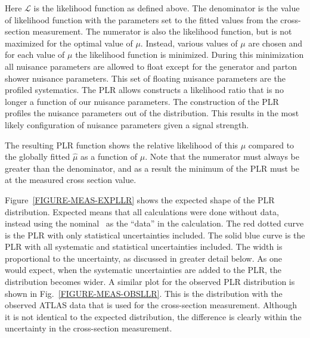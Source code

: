 \noindent
Here $\mathcal{L}$ is the likelihood function as defined above. The denominator is the value of likelihood function with the parameters set to the fitted values from the cross-section measurement. The numerator is also the likelihood function, but is not maximized for the optimal value of $\mu$. Instead, various values of $\mu$ are chosen and for each value of $\mu$ the likelihood function is minimized. During this minimization all nuisance parameters are allowed to float except for the generator and parton shower nuisance parameters. This set of floating nuisance parameters are the profiled systematics. The PLR allows constructs a likelihood ratio that is no longer a function of our nuisance parameters. The construction of the PLR profiles the nuisance parameters out of the distribution. This results in the most likely configuration of nuisance parameters given a signal strength. 


The resulting PLR function shows the relative likelihood of this $\mu$ compared to the globally fitted $\hat{\mu}$ as a function of $\mu$. Note that the numerator must always be greater than the denominator, and as a result the minimum of the PLR must be at the measured cross section value. 

Figure~\ref{FIGURE-MEAS-EXPLLR} shows the expected shape of the PLR distribution. Expected means that all calculations were done without data, instead using the nominal \MC\ as the ``data'' in the calculation. The red dotted curve is the PLR with only statistical uncertainties included. The solid blue curve is the PLR with all systematic and statistical uncertainties included. The width is proportional to the uncertainty, as discussed in greater detail below. As one would expect, when the systematic uncertainties are added to the PLR, the distribution becomes wider. A similar plot for the observed PLR distribution is shown in Fig.~\ref{FIGURE-MEAS-OBSLLR}. This is the distribution with the observed ATLAS data that is used for the cross-section measurement. Although it is not identical to the expected distribution, the difference is clearly within the uncertainty in the cross-section measurement.

